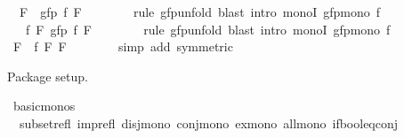 \begin{isabellebody}
\ {\isacharasterisk}{\kern0pt}{\isacharcolon}{\kern0pt}\ {\isachardoublequoteopen}{\isacharquery}{\kern0pt}F\ {\isacharequal}{\kern0pt}\ gfp\ {\isacharparenleft}{\kern0pt}f\ {\isacharquery}{\kern0pt}F{\isacharparenright}{\kern0pt}{\isachardoublequoteclose}\isanewline
\ \ \ \ \ \ \isamarkupfalse%
\ {\isacharparenleft}{\kern0pt}rule\ gfp{\isacharunderscore}{\kern0pt}unfold{\isacharparenright}{\kern0pt}\ {\isacharparenleft}{\kern0pt}blast\ intro{\isacharcolon}{\kern0pt}\ monoI\ gfp{\isacharunderscore}{\kern0pt}mono\ f{\isacharparenright}{\kern0pt}\isanewline
\ \ \ \ \isamarkupfalse%
\ \isamarkupfalse%
\ {\isachardoublequoteopen}{\isasymdots}\ {\isacharequal}{\kern0pt}\ f\ {\isacharquery}{\kern0pt}F\ {\isacharparenleft}{\kern0pt}gfp\ {\isacharparenleft}{\kern0pt}f\ {\isacharquery}{\kern0pt}F{\isacharparenright}{\kern0pt}{\isacharparenright}{\kern0pt}{\isachardoublequoteclose}\isanewline
\ \ \ \ \ \ \isamarkupfalse%
\ {\isacharparenleft}{\kern0pt}rule\ gfp{\isacharunderscore}{\kern0pt}unfold{\isacharparenright}{\kern0pt}\ {\isacharparenleft}{\kern0pt}blast\ intro{\isacharcolon}{\kern0pt}\ monoI\ gfp{\isacharunderscore}{\kern0pt}mono\ f{\isacharparenright}{\kern0pt}\isanewline
\ \ \ \ \isamarkupfalse%
\ \isamarkupfalse%
\ {\isachardoublequoteopen}{\isacharquery}{\kern0pt}F\ {\isasymle}\ f\ {\isacharquery}{\kern0pt}F\ {\isacharquery}{\kern0pt}F{\isachardoublequoteclose}\isanewline
\ \ \ \ \ \ \isamarkupfalse%
\ {\isacharparenleft}{\kern0pt}simp\ add{\isacharcolon}{\kern0pt}\ {\isacharasterisk}{\kern0pt}{\isacharbrackleft}{\kern0pt}symmetric{\isacharbrackright}{\kern0pt}{\isacharparenright}{\kern0pt}\isanewline
\ \ \isamarkupfalse%
\isanewline
{}\isamarkupfalse%
%
\endisatagproof
{\isafoldproof}%
%
\isadelimproof
%
\endisadelimproof
%
\isadelimdocument
%
\endisadelimdocument
%
\isatagdocument
%
\isamarkuptrue%
%
\endisatagdocument
{\isafolddocument}%
%
\isadelimdocument
%
\endisadelimdocument
%
\begin{isamarkuptext}%
Package setup.%
\end{isamarkuptext}\isamarkuptrue%
\isamarkupfalse%
\ basic{\isacharunderscore}{\kern0pt}monos\ {\isacharequal}{\kern0pt}\isanewline
\ \ subset{\isacharunderscore}{\kern0pt}refl\ imp{\isacharunderscore}{\kern0pt}refl\ disj{\isacharunderscore}{\kern0pt}mono\ conj{\isacharunderscore}{\kern0pt}mono\ ex{\isacharunderscore}{\kern0pt}mono\ all{\isacharunderscore}{\kern0pt}mono\ if{\isacharunderscore}{\kern0pt}bool{\isacharunderscore}{\kern0pt}eq{\isacharunderscore}{\kern0pt}conj\isanewline

\end{isabellebody}

